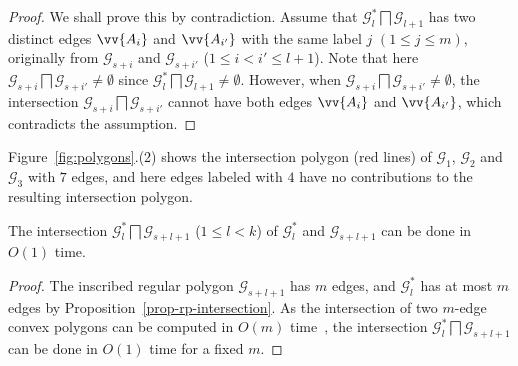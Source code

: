 \begin{proof}
We shall prove this by contradiction.
Assume that $\mathcal{G}^*_l \bigsqcap \mathcal{G}_{l+1}$ has two distinct edges $\vv{A_i}$ and $\vv{A_{i'}}$  with the same label $j$ $(1\le j \le m)$, originally from 
$\mathcal{G}_{s+i}$ and $\mathcal{G}_{s+i'}$  ($1\le i< i' \le l+1$).
%
Note that here $\mathcal{G}_{s+i} \bigsqcap \mathcal{G}_{s+i'} \ne \emptyset$ since $\mathcal{G}^*_l \bigsqcap \mathcal{G}_{l+1} \ne \emptyset$. 
%
However, when $\mathcal{G}_{s+i} \bigsqcap \mathcal{G}_{s+i'} \ne \emptyset$, the intersection $\mathcal{G}_{s+i} \bigsqcap \mathcal{G}_{s+i'}$ cannot have
both edges $\vv{A_i}$ and $\vv{A_{i'}}$, which contradicts the assumption.
\end{proof}



Figure~\ref{fig:polygons}.(2) shows the intersection polygon (red lines) of $\mathcal{G}_1$, $\mathcal{G}_2$ and $\mathcal{G}_3$ with $7$ edges, and here edges labeled with $4$ have no contributions to the resulting intersection polygon.

\begin{prop}
\label{prop-cpi-time}
The intersection $\mathcal{G}^*_l \bigsqcap \mathcal{G}_{s+l+1}$ ($ 1\le l< k$) of $\mathcal{G}^*_l$ and $\mathcal{G}_{s+l+1}$ can be done in $O(1)$
time.
\end{prop}

\begin{proof}
The inscribed regular polygon $\mathcal{G}_{s+l+1}$ has $m$ edges, and  $\mathcal{G}^*_l$ has at most $m$ edges by Proposition~\ref{prop-rp-intersection}. 
As the intersection of two $m$-edge convex polygons can be computed in $O(m)$ time~\cite{ORourke:Intersection}, the intersection $\mathcal{G}^*_l \bigsqcap \mathcal{G}_{s+l+1}$ can be done in $O(1)$ time for a fixed $m$.
\end{proof}





